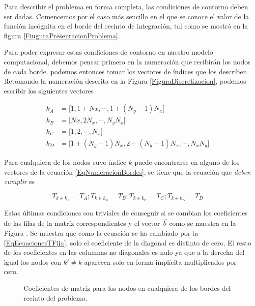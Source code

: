 
Para describir el problema en forma completa, las 
condiciones de contorno deben ser dadas. Comencemos
por el caso más sencillo en el que se conoce el 
valor de la función incógnita en el borde del
recinto de integración, tal como se mostró en
la figura \ref{FiuguraPresentacionProblema}.

Para poder expresar estas condiciones de contorno
en nuestro modelo computacional, debemos pensar 
primero en la numeración que recibirán los nodos
de cada borde. podemos entonces tomar los
vectores de índices que los describen. Retomando
la numeración descrita en la Figura \ref{FiguraDiscretizacion}, 
podemos escribir los siguientes vectores

\begin{equation}\label{EqNumeracionBordes}
  \begin{split}
  k_A &= \Big[1,1+Nx, \dotsi ,1+(N_y -1)N_x\Big]\\
  k_B &= \Big[Nx, 2N_x,  \dotsi , N_yN_x\Big]\\
  k_C &= \Big[1,2,\dotsi,N_x]\\
  k_D &= \Big[1+(N_y-1)N_x,2+(N_y-1)N_x,\dotsi, N_x N_y]
  \end{split}
\end{equation}

Para cualquiera de los nodos cuyo índice $k$ puede
encontrarse en alguno de los vectores de la ecuación
\ref{EqNumeracionBordes}, se tiene que la ecuación 
que \emph{deben cumplir} es

\begin{equation}\label{EqEcuacionesTFija}
  T_{k \in k_A} = T_A ;  T_{k \in k_B} = T_B ; T_{k \in k_C} = T_C ; T_{k \in k_D} = T_D
\end{equation}

Estas últimas condiciones son triviales de conseguir si 
se cambian los coeficientes de las filas de la matríz
correspondientes y el vector $\vec{b}$ como se 
muestra en la Figura \label{FiguraContornoTFija}. Se
muestra que como la ecuación se ha cambiado por 
la \ref{EqEcuacionesTFija}, solo el coeficiente 
de la diagonal es distinto de cero. El resto
de los coeficientes en las columnas no diagonales
es nulo ya que a la derecha del igual los nodos
con $ k' \neq k $ aparecen solo en forma implícita 
multiplicados por cero. 

\begin{figure}
  \caption{Coeficientes de matriz para los nodos
  en cualquiera de los bordes del recinto del problema.
  \label{FiguraContornoTFija}}
\end{figure}


